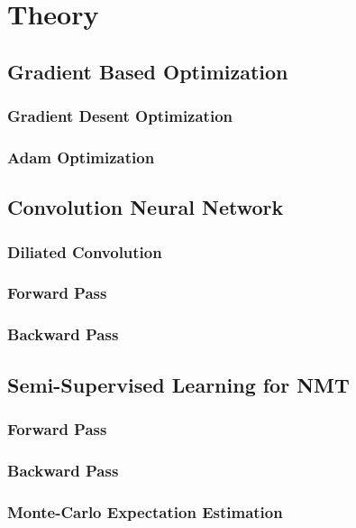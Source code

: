 \chapter{Theory}


\clearpage

\section{Gradient Based Optimization}
\subsection{Gradient Desent Optimization}
\subsection{Adam Optimization}
\clearpage

\section{Convolution Neural Network}
\subsection{Diliated Convolution}
\subsection{Forward Pass}
\subsection{Backward Pass}
\clearpage


\clearpage


\clearpage


\clearpage

\section{Semi-Supervised Learning for NMT}
\subsection{Forward Pass}
\subsection{Backward Pass}
\subsection{Monte-Carlo Expectation Estimation}
\clearpage